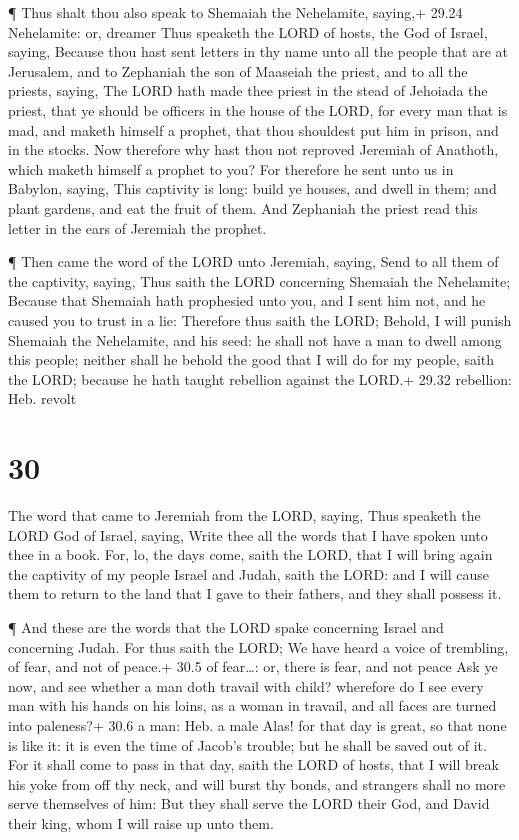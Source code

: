  ¶ Thus shalt thou also speak to Shemaiah the Nehelamite,
saying,+ 29.24 Nehelamite: or, dreamer  Thus speaketh the
LORD of hosts, the God of Israel, saying, Because thou hast sent letters
in thy name unto all the people that are at Jerusalem, and to Zephaniah
the son of Maaseiah the priest, and to all the priests, saying,
 The LORD hath made thee priest in the stead of Jehoiada
the priest, that ye should be officers in the house of the LORD, for
every man that is mad, and maketh himself a prophet, that thou shouldest
put him in prison, and in the stocks.  Now therefore why
hast thou not reproved Jeremiah of Anathoth, which maketh himself a
prophet to you?  For therefore he sent unto us in Babylon,
saying, This captivity is long: build ye houses, and dwell in them; and
plant gardens, and eat the fruit of them.  And Zephaniah
the priest read this letter in the ears of Jeremiah the prophet.

 ¶ Then came the word of the LORD unto Jeremiah, saying,
 Send to all them of the captivity, saying, Thus saith the
LORD concerning Shemaiah the Nehelamite; Because that Shemaiah hath
prophesied unto you, and I sent him not, and he caused you to trust in a
lie:  Therefore thus saith the LORD; Behold, I will punish
Shemaiah the Nehelamite, and his seed: he shall not have a man to dwell
among this people; neither shall he behold the good that I will do for
my people, saith the LORD; because he hath taught rebellion against the
LORD.+ 29.32 rebellion: Heb. revolt

\hypertarget{section-29}{%
\section{30}\label{section-29}}

 The word that came to Jeremiah from the LORD, saying,
 Thus speaketh the LORD God of Israel, saying, Write thee
all the words that I have spoken unto thee in a book.  For,
lo, the days come, saith the LORD, that I will bring again the captivity
of my people Israel and Judah, saith the LORD: and I will cause them to
return to the land that I gave to their fathers, and they shall possess
it.

 ¶ And these are the words that the LORD spake concerning
Israel and concerning Judah.  For thus saith the LORD; We
have heard a voice of trembling, of fear, and not of peace.+ 30.5 of
fear\ldots: or, there is fear, and not peace  Ask ye now,
and see whether a man doth travail with child? wherefore do I see every
man with his hands on his loins, as a woman in travail, and all faces
are turned into paleness?+ 30.6 a man: Heb. a male  Alas!
for that day is great, so that none is like it: it is even the time of
Jacob's trouble; but he shall be saved out of it.  For it
shall come to pass in that day, saith the LORD of hosts, that I will
break his yoke from off thy neck, and will burst thy bonds, and
strangers shall no more serve themselves of him:  But they
shall serve the LORD their God, and David their king, whom I will raise
up unto them.

